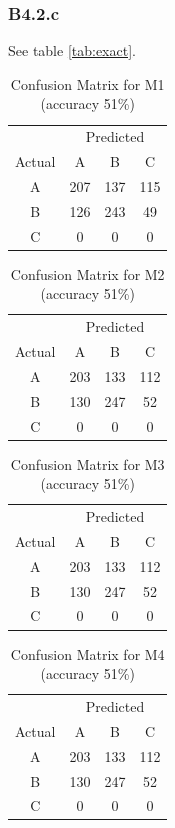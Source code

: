 \documentclass{article}
\begin{document}
\subsubsection*{B4.2.c}
\label{sec:B:B4:2.c}

See table \ref{tab:exact}.

\begin{table}[h!]
\centering
\label{tab:cm1}
\begin{tabular}{c|ccc}
 & \multicolumn{3}{c}{Predicted} \\
Actual & A & B & C \\
\hline
A & 207 & 137 & 115 \\
B & 126 & 243 & 49 \\
C & 0 & 0 & 0 \\
\end{tabular}
\caption{Confusion Matrix for M1 (accuracy 51\%)}
\end{table}

\begin{table}[h!]
\centering
\label{tab:cm2}
\begin{tabular}{c|ccc}
 & \multicolumn{3}{c}{Predicted} \\
Actual & A & B & C \\
\hline
A & 203 & 133 & 112 \\
B & 130 & 247 & 52 \\
C & 0 & 0 & 0 \\
\end{tabular}
\caption{Confusion Matrix for M2 (accuracy 51\%)}
\end{table}

\begin{table}[h!]
\centering
\label{tab:cm3}
\begin{tabular}{c|ccc}
 & \multicolumn{3}{c}{Predicted} \\
Actual & A & B & C \\
\hline
A & 203 & 133 & 112 \\
B & 130 & 247 & 52 \\
C & 0 & 0 & 0 \\
\end{tabular}
\caption{Confusion Matrix for M3 (accuracy 51\%)}
\end{table}

\begin{table}[h!]
\centering
\label{tab:cm4}
\begin{tabular}{c|ccc}
 & \multicolumn{3}{c}{Predicted} \\
Actual & A & B & C \\
\hline
A & 203 & 133 & 112 \\
B & 130 & 247 & 52 \\
C & 0 & 0 & 0 \\
\end{tabular}
\caption{Confusion Matrix for M4 (accuracy 51\%)}
\end{table}
\end{document}
